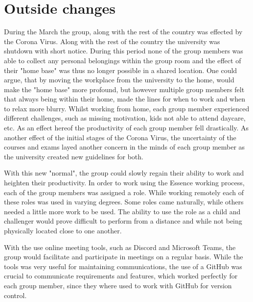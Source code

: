 \section{Outside changes}
During the March the group, along with the rest of the country was effected by the Corona Virus.
Along with the rest of the country the university was shutdown with short notice.
During this period none of the group members was able to collect any personal belongings within the group room and the effect of their "home base" was thus no longer possible in a shared location.
One could argue, that by moving the workplace from the university to the home, would make the "home base" more profound, but however multiple group members felt that always being within their home, made the lines for when to work and when to relax more blurry.
Whilst working from home, each group member experienced different challenges, such as missing motivation, kids not able to attend daycare, etc.
As an effect hereof the productivity of each group member fell drastically.
As another effect of the initial stages of the Corona Virus, the uncertainty of the courses and exams layed another concern in the minds of each group member as the university created new guidelines for both.

With this new "normal", the group could slowly regain their ability to work and heighten their productivity.
In order to work using the Essence working process, each of the group members was assigned a role.
While working remotely each of these roles was used in varying degrees.
Some roles came naturally, while others needed a little more work to be used.
The ability to use the role as a child and challenger would prove difficult to perform from a distance and while not being physically located close to one another. 

With the use online meeting tools, such as Discord and Microsoft Teams, the group would facilitate and participate in meetings on a regular basis.
While the tools was very useful for maintaining communications, the use of a GitHub was crucial to communicate requirements and features, which worked perfectly for each group member, since they where used to work with GitHub for version control.
